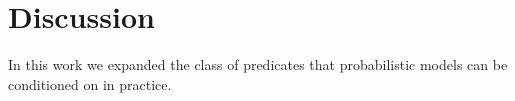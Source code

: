 \section{Discussion}
In this work we expanded the class of predicates that probabilistic models can be conditioned on in practice.








